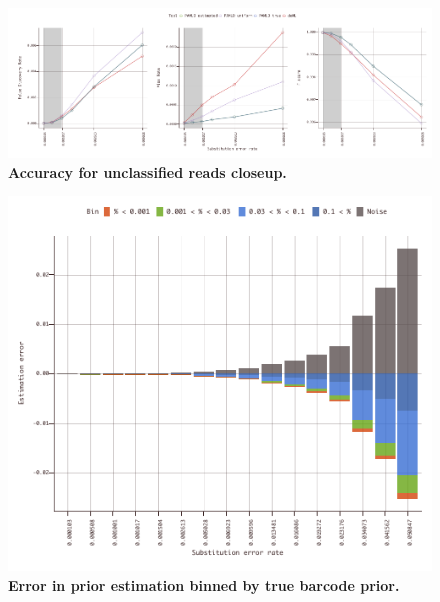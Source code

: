 \documentclass[10pt,twocolumn]{article}
\begin{document}
\begin{figure}[htbp]
\centering
\includegraphics[keepaspectratio,scale=1]{../plot/11_unclassified_accuracy_0060}
\caption{\footnotesize{\textbf{Accuracy for unclassified reads closeup.} } }
\label{fig:11}
\end{figure}

\begin{figure}[htbp]
\centering
\includegraphics[keepaspectratio,scale=1]{../plot/12_prior_estimation_error_0550_binned}
\caption{\footnotesize{\textbf{Error in prior estimation binned by true barcode prior. } } }
\label{fig:12}
\end{figure}
\end{document}
